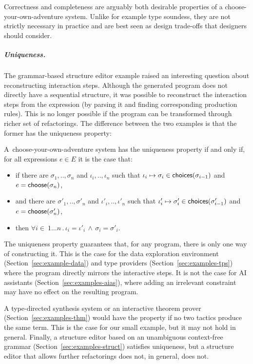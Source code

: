\documentclass[anonymous, a4paper,UKenglish,cleveref, autoref, thm-restate]{lipics-v2021}
\newcommand{\ident}[1]{\textsf{#1}}
\newcommand{\select}{\textnormal{\ident{choose}}}
\newcommand{\choices}{\textnormal{\ident{choices}}}
\begin{document}
Correctness and completeness are arguably both desirable properties of a choose-your-own-adventure
system. Unlike for example type soundess, they are not strictly necessary in practice and are best
seen as design trade-offs that designers should consider.

\newpage

\subparagraph{Uniqueness.}
The grammar-based structure editor example raised an interesting question about reconstructing
interaction steps. Although the generated program does not directly have a sequential structure,
it was possible to reconstruct the interaction steps from the expression (by parsing it and
finding corresponding production rules). This is no longer possible if the program can be
transformed through richer set of refactorings. The difference between the two examples is that
the former has the uniqueness property:

\begin{definition}[Uniqueness]
A~choose-your-own-adventure system has the uniqueness property if and only if,
for all expressions $e\in E$ it is the case that:
\begin{itemize}
\item if there are $\sigma_1,..,\sigma_n$ and $\iota_i,..,\iota_n$ such that
  $\iota_i\mapsto\sigma_i \in \choices(\sigma_{i-1})$ and $e=\select(\sigma_n)$,
\item and there are $\sigma'_1,..,\sigma'_n$ and $\iota'_i,..,\iota'_n$ such that
  $\iota'_i\mapsto\sigma'_i \in \choices(\sigma'_{i-1})$ and $e=\select(\sigma'_n)$,
\item then $\forall i\!\in\!\ 1\ldots n\,.\,\iota_i=\iota'_i\,\wedge\,\sigma_i=\sigma'_i$.
\end{itemize}
\end{definition}

The uniqueness property guarantees that, for any program, there is only one way of constructing
it. This is the case for the data exploration environment (Section~\ref{sec:example-data}) and
type providers (Section~\ref{sec:examples-tps}) where the program directly mirrors the interactive
steps. It is not the case for AI assistants (Section~\ref{sec:examples-aias}), where adding
an irrelevant constraint may have no effect on the resulting program.

A type-directed synthesis system or an interactive theorem prover (Section~\ref{sec:examples-thm})
would have the property if no two tactics produce the same term. This is the case for our small
example, but it may not hold in general. Finally, a structure editor based on an unambiguous
context-free grammar (Section~\ref{sec:examples-struct}) satisfies uniqueness, but a structure
editor that allows further refactorings does not, in general, does not.
\end{document}
